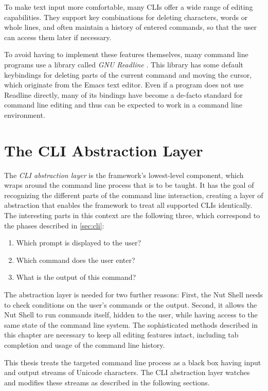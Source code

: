 \documentclass[paper=a4,abstract=on,cleardoublepage=empty,numbers=noenddot,toc=bib,12pt,appendixprefix=true]{scrreprt}
\begin{document}
To make text input more comfortable, many CLIs offer a wide range of editing capabilities. They support key combinations for deleting characters, words or whole lines, and often maintain a history of entered commands, so that the user can access them later if necessary.

To avoid having to implement these features themselves, many command line programs use a library called \textsl{\textsc{GNU} Readline} \cite{readline}. This library has some default keybindings for deleting parts of the current command and moving the cursor, which originate from the Emacs text editor. Even if a program does not use Readline directly, many of its bindings have become a de-facto standard for command line editing and thus can be expected to work in a command line environment.

\chapter{The \textsc{CLI} Abstraction Layer}
\label{sec:cliparser}

The \textsl{\textsc{CLI} abstraction layer} is the framework's lowest-level component, which wraps around the command line process that is to be taught. It has the goal of recognizing the different parts of the command line interaction, creating a layer of abstraction that enables the framework to treat all supported \textsc{CLI}s identically. The interesting parts in this context are the following three, which correspond to the phases described in \cref{sec:cli}:

\begin{enumerate}
    \item Which prompt is displayed to the user?
    \item Which command does the user enter?
    \item What is the output of this command?
\end{enumerate}

The abstraction layer is needed for two further reasons: First, the Nut Shell needs to check conditions on the user's commands or the output. Second, it allows the Nut Shell to run commands itself, hidden to the user, while having access to the same state of the command line system. The sophisticated methods described in this chapter are necessary to keep all editing features intact, including tab completion and usage of the command line history.

This thesis treats the targeted command line process as a black box having input and output streams of Unicode characters. The \textsc{CLI} abstraction layer watches and modifies these streams as described in the following sections.
\end{document}
